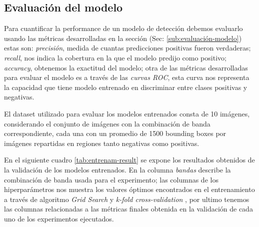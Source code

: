 \subsection*{Evaluación del modelo}\label{sub:evaluacion_class}

Para cuantificar la performance de un modelo de detección debemos evaluarlo usando las métricas desarrolladas en la sección (Sec: \ref{sub:evaluación-modelo}) estas son: \textit{precisión}, medida de cuantas predicciones positivas fueron verdaderas; \textit{recall}, nos indica la cobertura en la que el modelo predijo como positivo; \textit{accuracy}, obtenemos la exactitud del modelo; otra de las métricas desarrolladas para evaluar el modelo es a través de las \textit{curvas ROC}, esta curva nos representa la capacidad que tiene modelo entrenado en discriminar entre clases positivas y negativas.

El dataset utilizado para evaluar los modelos entrenados  consta de 10 imágenes, considerando el conjunto de imágenes con la combinación de banda correspondiente, cada una con un promedio de 1500 bounding boxes por imágenes repartidas en regiones tanto negativas como positivas.


En el siguiente cuadro \ref{tab:entrenam-result} se expone los resultados obtenidos de la validación de los modelos entrenados. En la columna \textit{bandas} describe la combinación de banda usada para el experimento; las columnas  de los hiperparámetros nos muestra los valores óptimos encontrados en el entrenamiento a través de algoritmo \textit{Grid Search} y \textit{k-fold cross-validation} , por ultimo tenemos las columnas relacionadas a las métricas finales obtenida en la validación de cada uno de los experimentos ejecutados.


